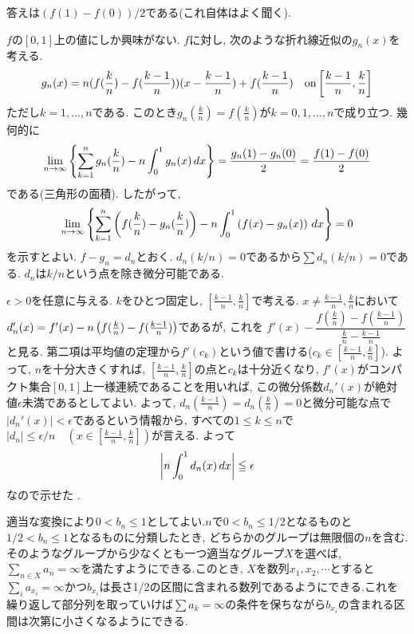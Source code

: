 {\begin{probans} \label{prob:R2kiso-7} %
答えは$(f(1) - f(0)) /2$である(これ自体はよく聞く). \par
$f$の$[0,1]$上の値にしか興味がない. $f$に対し, 次のような折れ線近似の$g_n(x)$を考える.
\[g_n(x) = n(f(\frac{k}{n}) - f(\frac{k-1}{n}))(x - \frac{k-1}{n}) + f(\frac{k-1}{n}) \quad \mathrm{on}  \left[ \frac{k-1}{n}, \frac{k}{n} \right]
\]
ただし$k=1,\dots, n$である.
このとき$g_n(\frac{k}{n}) = f(\frac{k}{n})$が$k=0,1,\dots, n$で成り立つ. 幾何的に
\[\lim_{n\to \infty} \left\{ \sum_{k=1}^{n} g_n(\frac{k}{n}) - n\int_{0}^{1} g_n(x) \, dx \right\} =  \dfrac{g_n(1) - g_n(0)}{2} = \dfrac{f(1) - f(0)}{2}\]
である(三角形の面積). したがって,
\[\lim_{n\to \infty} \left\{ \sum_{k=1}^{n}\left( f(\frac{k}{n}) - g_n(\frac{k}{n}) \right) - n\int_{0}^{1}\left( f(x) - g_n(x) \right)\, dx  \right\} = 0\]
を示すとよい. $f-g_n = d_n$とおく. $d_n(k/n) = 0$であるから$\sum d_n(k/n) = 0$である.
 $d_n$は$k/n$という点を除き微分可能である. \par
 $\epsilon > 0$を任意に与える. $k$をひとつ固定し, $[\frac{k-1}{n}, \frac{k}{n}]$で考える. $x\neq \frac{k-1}{n},\frac{k}
 {n}$において $d_n'(x) = f'(x) - n\left( f(\frac{k}{n}) - f(\frac{k-1}{n}) \right)$であるが, これを $f'(x) - \dfrac{f(\frac{k}{n}) - f(\frac{k-1}{n})}{\frac{k}{n} - \frac{k-1}{n}}$
と見る. 第二項は平均値の定理から$f'(c_k)$という値で書ける($c_k \in [\frac{k-1}{n}, \frac{k}{n}]$). よって, $n$を十分大きくすれば, $[\frac{k-1}{n}, \frac{k}{n}]$の点と$c_k$は十分近くなり, $f'(x)$がコンパクト集合$[0,1]$上一様連続であることを用いれば, この微分係数$d_n'(x)$が絶対値$\epsilon$未満であるとしてよい. よって, $d_n(\frac{k-1}{n}) = d_n(\frac{k}{n}) = 0$と微分可能な点で$|d_n'(x)| < \epsilon$であるという情報から, すべての$1\leq k\leq n$で $|d_n| \leq \epsilon/n \quad (x\in [\frac{k-1}{n},\frac{k}{n}])$が言える. よって
\[\left| n\int_{0}^{1} d_n(x)\, dx \right| \leqq \epsilon\]
なので示せた .

\end{probans}


\begin{probans} %
適当な変換により$0 < b_n \leq 1$としてよい.$n$で$0<b_n \leq 1/2$となるものと$1/2< b_n \leq 1$となるものに分類したとき, どちらかのグループは無限個の$n$を含む.そのようなグループから少なくとも一つ適当なグループ$X$を選べば, $\sum_{n\in X} a_n = \infty$を満たすようにできる.このとき,  $X$を数列$x_1,x_2,\cdots$とすると$\sum_{i}a_{x_i} = \infty$かつ$b_{x_i}$は長さ1/2の区間に含まれる数列であるようにできる.これを繰り返して部分列を取っていけば$\sum a_k = \infty$の条件を保ちながら$b_{x_{i}}$の含まれる区間は次第に小さくなるようにできる.
\end{probans}

}

\newpage
